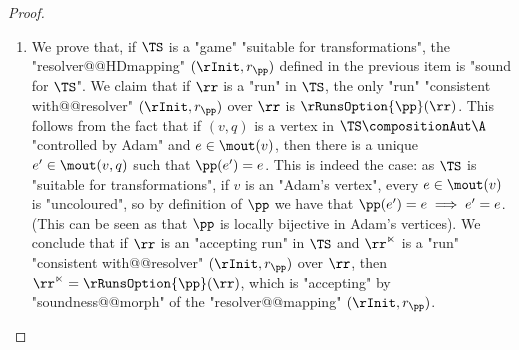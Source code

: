 \documentclass{theoretics}
\begin{document}
\begin{proof}
\begin{enumerate}
		\item We prove that, if $\TS$ is a "game" "suitable for transformations", the "resolver@@HDmapping" $(\rInit, r_\pp)$ defined in the previous item is "sound for $\TS$". We claim that if $\rr$ is a "run" in $\TS$, the only "run" "consistent with@@resolver" $(\rInit, r_\pp)$ over $\rr$ is $\rRunsOption{\pp}(\rr)$. This follows from the fact that if $(v,q)$ is a vertex in $\TS \compositionAut\A$ "controlled by Adam" and $e\in \mout(v)$, then there is a unique $e'\in \mout(v,q)$ such that $\pp(e') = e$. This is indeed the case: as $\TS$ is "suitable for transformations", if $v$ is an "Adam's vertex", every $e\in \mout(v)$ is "uncoloured", so by definition of $\pp$ we have that $\pp(e') = e \implies e'=e$. (This can be seen as that $\pp$ is locally bijective in Adam's vertices).
		We conclude that if $\rr$ is an "accepting run" in $\TS$ and $\rr^\ltimes$ is a "run" "consistent with@@resolver" $(\rInit, r_\pp)$ over $\rr$, then $\rr^\ltimes = \rRunsOption{\pp}(\rr)$, which is "accepting" by "soundness@@morph" of the "resolver@@mapping" $(\rInit, r_\pp)$.\qedhere
	\end{enumerate}	
\end{proof}
\end{document}
